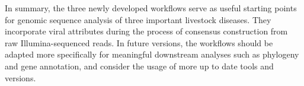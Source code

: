 In summary, the three newly developed workflows serve as useful starting points for genomic sequence analysis of three important livestock diseases. They incorporate viral attributes during the process of consensus construction from raw Illumina-sequenced reads. In future versions, the workflows should be adapted more specifically for meaningful downstream analyses such as phylogeny and gene annotation, and consider the usage of more up to date tools and versions.
